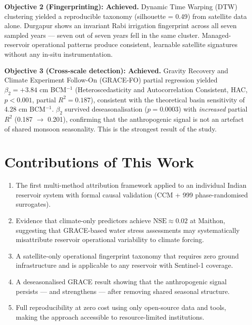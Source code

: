 \documentclass[12pt,a4paper,oneside]{report}
\newcommand{\NSE}{\mathrm{NSE}}
\begin{document}
\textbf{Objective 2 (Fingerprinting): Achieved.} Dynamic Time Warping (DTW)
clustering yielded a reproducible taxonomy (silhouette = 0.49) from satellite
data alone. Durgapur shows an invariant Rabi irrigation fingerprint across
all seven sampled years --- seven out of seven years fell in the same cluster.
Managed-reservoir operational patterns produce consistent, learnable satellite
signatures without any in-situ instrumentation.

\textbf{Objective 3 (Cross-scale detection): Achieved.} Gravity Recovery and
Climate Experiment Follow-On (GRACE-FO) partial regression yielded
$\beta_2 = +3.84$ cm BCM$^{-1}$ (Heteroscedasticity and Autocorrelation
Consistent, HAC, $p < 0.001$, partial $R^2 = 0.187$), consistent with the
theoretical basin sensitivity of 4.28 cm BCM$^{-1}$. $\beta_2$
survived deseasonalisation ($p = 0.0003$) with \textit{increased} partial
$R^2$ (0.187 $\to$ 0.201), confirming that the anthropogenic signal is not
an artefact of shared monsoon seasonality. This is the strongest result of
the study.

\section{Contributions of This Work}

\begin{enumerate}[leftmargin=*]
  \item The first multi-method attribution framework applied to an individual
    Indian reservoir system with formal causal validation (CCM + 999
    phase-randomised surrogates).
  \item Evidence that climate-only predictors achieve
    $\NSE \approx 0.02$ at Maithon, suggesting that GRACE-based
    water stress assessments may systematically misattribute reservoir
    operational variability to climate forcing.
  \item A satellite-only operational fingerprint taxonomy that requires zero
    ground infrastructure and is applicable to any reservoir with Sentinel-1
    coverage.
  \item A deseasonalised GRACE result showing that the anthropogenic
    signal persists --- and strengthens --- after removing shared seasonal
    structure.
  \item Full reproducibility at zero cost using only open-source data
    and tools, making the approach accessible to resource-limited institutions.
\end{enumerate}
\end{document}
